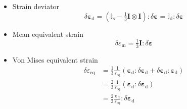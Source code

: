 \documentclass[namecite, fleqn]{goose-article}
\begin{document}
\begin{itemize}

    \item Strain deviator
    \begin{equation}
        \delta \bm{\varepsilon}_\mathrm{d}
        = \left( \mathbb{I}_\mathrm{s} - \tfrac{1}{3} \bm{I} \otimes \bm{I} \right) :
        \delta \bm{\varepsilon}
        = \mathbb{I}_\mathrm{d} : \delta \bm{\varepsilon}
    \end{equation}

    \item Mean equivalent strain
    \begin{equation}
        \delta \varepsilon_\mathrm{m}
        = \tfrac{1}{3} \bm{I} : \delta \bm{\varepsilon}
    \end{equation}

    \item Von Mises equivalent strain
    \begin{align}
        \delta \varepsilon_\mathrm{eq}
        &= \frac{1}{3} \frac{1}{\varepsilon_\mathrm{eq}}
        \left( \bm{\varepsilon}_\mathrm{d} : \delta \bm{\varepsilon}_\mathrm{d} +
        \delta \bm{\varepsilon}_\mathrm{d} : \bm{\varepsilon}_\mathrm{d} \right) \\
        &= \frac{2}{3} \frac{1}{\varepsilon_\mathrm{eq}}
        \left( \bm{\varepsilon}_\mathrm{d} : \delta \bm{\varepsilon}_\mathrm{d} \right) \\
        &= \frac{2}{3} \frac{\bm{\varepsilon}_\mathrm{d}}{\varepsilon_\mathrm{eq}} :
        \delta \bm{\varepsilon}_\mathrm{d}
    \end{align}

\end{itemize}
\end{document}
